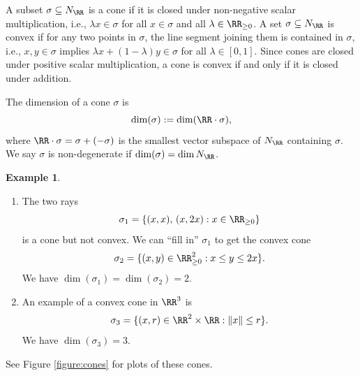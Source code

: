 \documentclass[12pt]{amsart}
\theoremstyle{plain}
\theoremstyle{definition}
\newtheorem{example}[theorem]{Example}
\begin{document}
A subset $\sigma \subseteq N_\RR$ is a cone if it is closed under non-negative scalar multiplication, i.e., $\lambda x \in \sigma$ for all $x \in \sigma$ and all $\lambda \in \RR_{\ge 0}$.
A set $\sigma \subseteq N_\RR$ is convex if for any two points in $\sigma$, the line segment joining them is contained in $\sigma$,
i.e., $x, y \in \sigma$ implies $\lambda x + (1 - \lambda) y \in \sigma$ for all $\lambda \in [0, 1]$.
Since cones are closed under positive scalar multiplication, a cone is convex if and only if it is closed under addition.

The dimension of a cone $\sigma$ is
$$\dim(\sigma) := \dim(\RR \cdot \sigma),$$
where $\RR\cdot\sigma = \sigma + (-\sigma)$ is the smallest vector subspace of $N_\RR$ containing $\sigma$.
We say $\sigma$ is non-degenerate if $\dim(\sigma) = \dim N_\RR$.

\begin{example}\label{example:cones}
\begin{enumerate}
\item
The two rays
$$\sigma_1 = \{(x, x), \, (x, 2x) : x \in \RR_{\ge 0}\}$$
is a cone but not convex.
We can ``fill in'' $\sigma_1$ to get the convex cone
$$\sigma_2 = \{(x, y) \in \RR_{\ge 0}^2 : x \le y \le 2 x\}.$$
We have $\dim (\sigma_1) = \dim(\sigma_2)=2$.

\item
An example of a convex cone in $\RR^3$ is
$$\sigma_3 = \{(x, r) \in \RR^2 \times \RR : \|x\| \le r\}.$$
We have $\dim(\sigma_3)=3$.
\end{enumerate}
\noindent
See Figure \ref{figure:cones} for plots of these cones.
\end{example}
\end{document}
